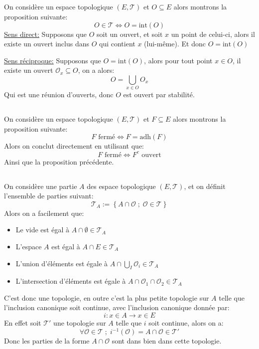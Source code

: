 \documentclass{report}
\begin{document}
      \subsection*{}
         On considère un espace topologique \((E, \mathcal{T})\) et \(O \subseteq E\) alors montrons la proposition suivante:
         \[
            O \in \mathcal{T} \Longleftrightarrow O = \text{int}(O)
         \]
         \uline{Sens direct:} Supposons que \(O\) soit un ouvert, et soit \(x\) un point de celui-ci, alors il existe un ouvert inclus dans \(O\) qui contient \(x\) (lui-même). Et donc \(O = \text{int}(O)\)

         \uline{Sens réciproque:} Supposons que \(O = \text{int}(O)\), alors pour tout point \(x \in O\), il existe un ouvert \(\mathcal{O}_x \subseteq O\), on a alors:
         \[
            O = \bigcup_{x \in O } O_x
         \]
         Qui est une réunion d'ouverts, donc \(O\) est ouvert par stabilité.
      \subsection*{}
         On considère un espace topologique \((E, \mathcal{T})\) et \(F \subseteq E\) alors montrons la proposition suivante:
         \[
            F \text{ fermé} \Longleftrightarrow F = \text{adh}(F)
         \]
         Alors on conclut directement en utilisant que:
         \[
            F \text{ fermé} \Longleftrightarrow F^c \text{ ouvert}
         \]
         Ainsi que la proposition précédente.
      \subsection*{}
         On considère une partie $A$ des espace topologique $(E, \mathcal{T})$, et on définit l'ensemble de parties suivant:
         $$
            \mathcal{T}_A := \left\{ A \cap \mathcal{O} \; ; \; \mathcal{O} \in \mathcal{T}\right\}
         $$
         Alors on a facilement que:
         \begin{itemize}
            \item Le vide est égal à $A \cap \emptyset \in \mathcal{T}_A$
            \item L'espace $A$ est égal à $A \cap E \in \mathcal{T}_A$
            \item L'union d'éléments est égale à $A \cap \bigcup_I \mathcal{O}_i \in \mathcal{T}_A$
            \item L'intersection d'éléments est égale à $A \cap \mathcal{O}_1 \cap \mathcal{O}_2 \in \mathcal{T}_A$
         \end{itemize}
         C'est donc une topologie, en outre c'est la plus petite topologie sur $A$ telle que l'inclusion canonique soit continue, avec l'inclusion canonique donnée par:
         $$
            i : x \in A \rightarrow x \in E
         $$
         En effet soit $\mathcal{T}'$ une topologie sur $A$ telle que $i$ soit continue, alors on a:
         $$
            \forall \mathcal{O} \in \mathcal{T} \; ; \; i^{-1}(\mathcal{O}) = A \cap \mathcal{O} \in \mathcal{T}'
         $$
         Donc les parties de la forme $A \cap \mathcal{O}$ sont dans bien dans cette topologie.
\end{document}
